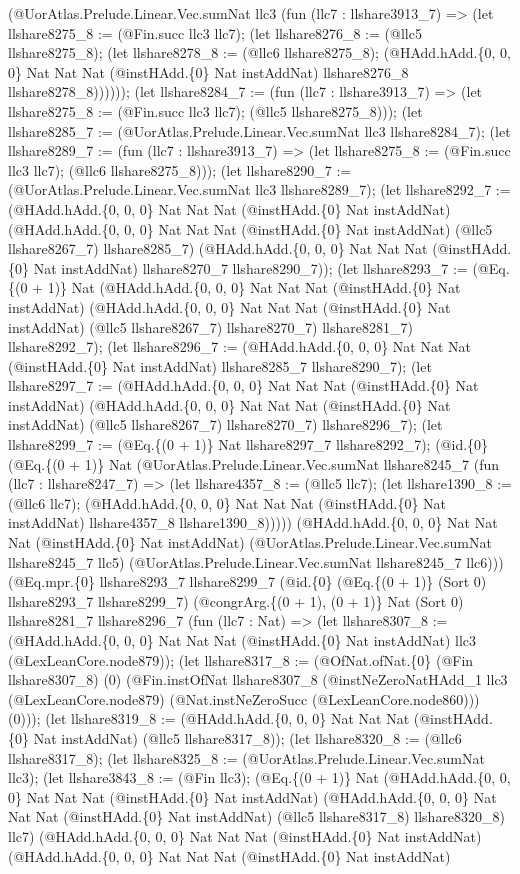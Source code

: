\documentclass[11pt]{article}
\begin{document}
(@UorAtlas.Prelude.Linear.Vec.sumNat llc3 (fun (llc7 : llshare3913\_7) => (let llshare8275\_8 := (@Fin.succ llc3 llc7); (let llshare8276\_8 := (@llc5 llshare8275\_8); (let llshare8278\_8 := (@llc6 llshare8275\_8); (@HAdd.hAdd.\{0, 0, 0\} Nat Nat Nat (@instHAdd.\{0\} Nat instAddNat) llshare8276\_8 llshare8278\_8)))))); (let llshare8284\_7 := (fun (llc7 : llshare3913\_7) => (let llshare8275\_8 := (@Fin.succ llc3 llc7); (@llc5 llshare8275\_8))); (let llshare8285\_7 := (@UorAtlas.Prelude.Linear.Vec.sumNat llc3 llshare8284\_7); (let llshare8289\_7 := (fun (llc7 : llshare3913\_7) => (let llshare8275\_8 := (@Fin.succ llc3 llc7); (@llc6 llshare8275\_8))); (let llshare8290\_7 := (@UorAtlas.Prelude.Linear.Vec.sumNat llc3 llshare8289\_7); (let llshare8292\_7 := (@HAdd.hAdd.\{0, 0, 0\} Nat Nat Nat (@instHAdd.\{0\} Nat instAddNat) (@HAdd.hAdd.\{0, 0, 0\} Nat Nat Nat (@instHAdd.\{0\} Nat instAddNat) (@llc5 llshare8267\_7) llshare8285\_7) (@HAdd.hAdd.\{0, 0, 0\} Nat Nat Nat (@instHAdd.\{0\} Nat instAddNat) llshare8270\_7 llshare8290\_7)); (let llshare8293\_7 := (@Eq.\{(0 + 1)\} Nat (@HAdd.hAdd.\{0, 0, 0\} Nat Nat Nat (@instHAdd.\{0\} Nat instAddNat) (@HAdd.hAdd.\{0, 0, 0\} Nat Nat Nat (@instHAdd.\{0\} Nat instAddNat) (@llc5 llshare8267\_7) llshare8270\_7) llshare8281\_7) llshare8292\_7); (let llshare8296\_7 := (@HAdd.hAdd.\{0, 0, 0\} Nat Nat Nat (@instHAdd.\{0\} Nat instAddNat) llshare8285\_7 llshare8290\_7); (let llshare8297\_7 := (@HAdd.hAdd.\{0, 0, 0\} Nat Nat Nat (@instHAdd.\{0\} Nat instAddNat) (@HAdd.hAdd.\{0, 0, 0\} Nat Nat Nat (@instHAdd.\{0\} Nat instAddNat) (@llc5 llshare8267\_7) llshare8270\_7) llshare8296\_7); (let llshare8299\_7 := (@Eq.\{(0 + 1)\} Nat llshare8297\_7 llshare8292\_7); (@id.\{0\} (@Eq.\{(0 + 1)\} Nat (@UorAtlas.Prelude.Linear.Vec.sumNat llshare8245\_7 (fun (llc7 : llshare8247\_7) => (let llshare4357\_8 := (@llc5 llc7); (let llshare1390\_8 := (@llc6 llc7); (@HAdd.hAdd.\{0, 0, 0\} Nat Nat Nat (@instHAdd.\{0\} Nat instAddNat) llshare4357\_8 llshare1390\_8))))) (@HAdd.hAdd.\{0, 0, 0\} Nat Nat Nat (@instHAdd.\{0\} Nat instAddNat) (@UorAtlas.Prelude.Linear.Vec.sumNat llshare8245\_7 llc5) (@UorAtlas.Prelude.Linear.Vec.sumNat llshare8245\_7 llc6))) (@Eq.mpr.\{0\} llshare8293\_7 llshare8299\_7 (@id.\{0\} (@Eq.\{(0 + 1)\} (Sort 0) llshare8293\_7 llshare8299\_7) (@congrArg.\{(0 + 1), (0 + 1)\} Nat (Sort 0) llshare8281\_7 llshare8296\_7 (fun (llc7 : Nat) => (let llshare8307\_8 := (@HAdd.hAdd.\{0, 0, 0\} Nat Nat Nat (@instHAdd.\{0\} Nat instAddNat) llc3 (@LexLeanCore.node879)); (let llshare8317\_8 := (@OfNat.ofNat.\{0\} (@Fin llshare8307\_8) (0) (@Fin.instOfNat llshare8307\_8 (@instNeZeroNatHAdd\_1 llc3 (@LexLeanCore.node879) (@Nat.instNeZeroSucc (@LexLeanCore.node860))) (0))); (let llshare8319\_8 := (@HAdd.hAdd.\{0, 0, 0\} Nat Nat Nat (@instHAdd.\{0\} Nat instAddNat) (@llc5 llshare8317\_8)); (let llshare8320\_8 := (@llc6 llshare8317\_8); (let llshare8325\_8 := (@UorAtlas.Prelude.Linear.Vec.sumNat llc3); (let llshare3843\_8 := (@Fin llc3); (@Eq.\{(0 + 1)\} Nat (@HAdd.hAdd.\{0, 0, 0\} Nat Nat Nat (@instHAdd.\{0\} Nat instAddNat) (@HAdd.hAdd.\{0, 0, 0\} Nat Nat Nat (@instHAdd.\{0\} Nat instAddNat) (@llc5 llshare8317\_8) llshare8320\_8) llc7) (@HAdd.hAdd.\{0, 0, 0\} Nat Nat Nat (@instHAdd.\{0\} Nat instAddNat) (@HAdd.hAdd.\{0, 0, 0\} Nat Nat Nat (@instHAdd.\{0\} Nat instAddNat) 
\end{document}
